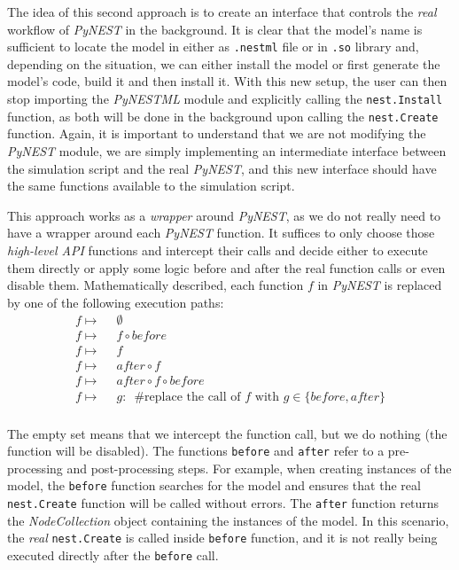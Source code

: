 The idea of this second approach is to create an interface that controls the \emph{real} workflow of \emph{PyNEST} in the background. It is clear that the model's name is sufficient to locate the model in either as \texttt{.nestml} file or in \texttt{.so} library and, depending on the situation, we can either install the model or first generate the model's code, build it and then install it. With this new setup, the user can then stop importing the \emph{PyNESTML} module and explicitly calling the \texttt{nest.Install} function, as both will be done in the background upon calling the \texttt{nest.Create} function. Again, it is important to understand that we are not modifying the \emph{PyNEST} module, we are simply implementing an intermediate interface between the simulation script and the real \emph{PyNEST}, and this new interface should have the same functions available to the simulation script.



This approach works as a \emph{wrapper} around \emph{PyNEST}, as we do not really need to have a wrapper around each \emph{PyNEST} function. It suffices to only choose those \emph{high-level API} functions and intercept their calls and decide either to execute them directly or apply some logic before and after the real function calls or even disable them.  Mathematically described, each function $f$ in \emph{PyNEST} is replaced by one of the following execution paths:
\begin{align*} 
f \mapsto&\enspace\emptyset\\
f \mapsto&\enspace f \circ before \\
f \mapsto&\enspace f \\
f \mapsto&\enspace after \circ f \\
f \mapsto&\enspace after \circ f \circ before\\
f \mapsto&\enspace g:\enspace \text{\#replace the call of } f \text{ with } g \in \{before, after\}  \\
\end{align*}


The empty set means that we intercept the function call, but we do nothing (the function will be disabled). The functions \texttt{before} and \texttt{after} refer to a pre-processing and post-processing steps. For example, when creating instances of the model, the \texttt{before} function searches for the model and ensures that the real \texttt{nest.Create} function will be called without errors. The \texttt{after} function returns the \emph{NodeCollection} object containing the instances of the model. In this scenario, the \emph{real} \texttt{nest.Create} is called inside \texttt{before} function, and it is not really being executed directly after the \texttt{before} call. 

